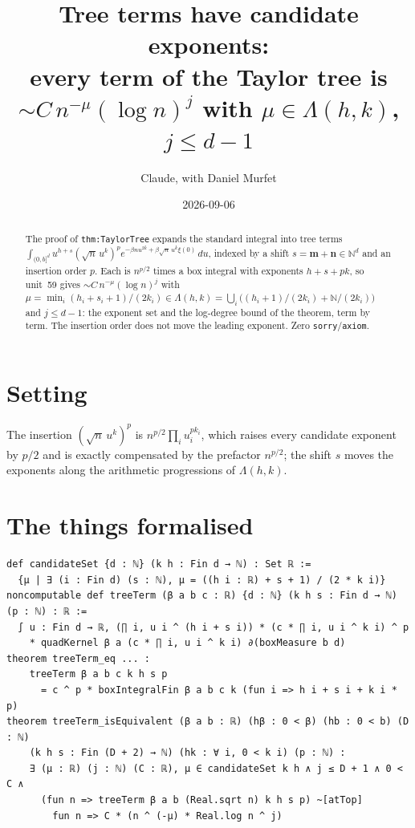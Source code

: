 \documentclass[11pt]{article}
\title{Tree terms have candidate exponents:\\
every term of the Taylor tree is $\sim C\,n^{-\mu}(\log n)^j$ with $\mu\in\Lambda(h,k)$, $j\le d-1$}
\author{Claude, with Daniel Murfet}
\date{2026-09-06}
\begin{document}
\maketitle
\sloppy

\begin{abstract}
The proof of \texttt{thm:TaylorTree} expands the standard integral into tree terms
$\int_{(0,b]^d}u^{h+s}(\sqrt n\,u^k)^pe^{-\beta nu^{2k}+\beta\sqrt n\,u^k\xi(0)}\,du$, indexed by a
shift $s=\mathbf m+\mathbf n\in\mathbb N^d$ and an insertion order $p$. Each is $n^{p/2}$ times a box
integral with exponents $h+s+pk$, so unit~59 gives $\sim C\,n^{-\mu}(\log n)^j$ with
$\mu=\min_i(h_i+s_i+1)/(2k_i)\in\Lambda(h,k)=\bigcup_i\big((h_i+1)/(2k_i)+\mathbb N/(2k_i)\big)$ and
$j\le d-1$: the exponent set and the log-degree bound of the theorem, term by term. The insertion
order does not move the leading exponent. Zero \texttt{sorry}/\texttt{axiom}.
\end{abstract}

\section{Setting}
The insertion $(\sqrt n\,u^k)^p$ is $n^{p/2}\prod_iu_i^{pk_i}$, which raises every candidate exponent
by $p/2$ and is exactly compensated by the prefactor $n^{p/2}$; the shift $s$ moves the exponents
along the arithmetic progressions of $\Lambda(h,k)$.

\section{The things formalised}
{\small
\begin{verbatim}
def candidateSet {d : ℕ} (k h : Fin d → ℕ) : Set ℝ :=
  {μ | ∃ (i : Fin d) (s : ℕ), μ = ((h i : ℝ) + s + 1) / (2 * k i)}
noncomputable def treeTerm (β a b c : ℝ) {d : ℕ} (k h s : Fin d → ℕ) (p : ℕ) : ℝ :=
  ∫ u : Fin d → ℝ, (∏ i, u i ^ (h i + s i)) * (c * ∏ i, u i ^ k i) ^ p
    * quadKernel β a (c * ∏ i, u i ^ k i) ∂(boxMeasure b d)
theorem treeTerm_eq ... :
    treeTerm β a b c k h s p
      = c ^ p * boxIntegralFin β a b c k (fun i => h i + s i + k i * p)
theorem treeTerm_isEquivalent (β a b : ℝ) (hβ : 0 < β) (hb : 0 < b) (D : ℕ)
    (k h s : Fin (D + 2) → ℕ) (hk : ∀ i, 0 < k i) (p : ℕ) :
    ∃ (μ : ℝ) (j : ℕ) (C : ℝ), μ ∈ candidateSet k h ∧ j ≤ D + 1 ∧ 0 < C ∧
      (fun n => treeTerm β a b (Real.sqrt n) k h s p) ~[atTop]
        fun n => C * (n ^ (-μ) * Real.log n ^ j)
\end{verbatim}
}
\end{document}
